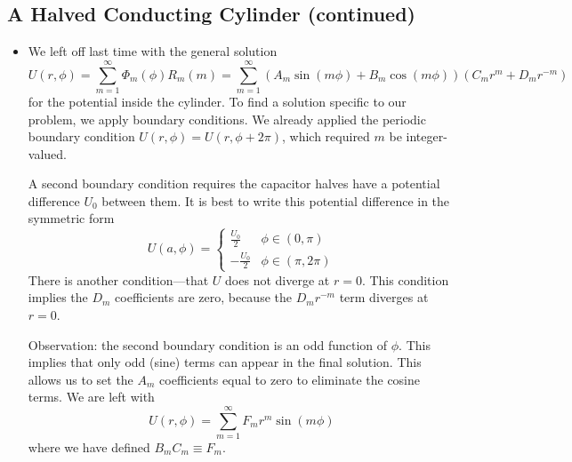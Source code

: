 \documentclass[11pt, a4paper]{article}
\begin{document}
\subsection{A Halved Conducting Cylinder (continued)}
\begin{itemize}	
		
	\item We left off last time with the general solution
	\begin{equation*}
		U(r, \phi) = \sum_{m = 1}^{\infty}\Phi_{m}(\phi)R_{m}(m) = \sum_{m = 1}^{\infty} \left(A_{m} \sin(m\phi) + B_{m}\cos(m\phi)\right)\left( C_{m}r^{m} + D_{m}r^{-m} \right)
	\end{equation*}
	for the potential inside the cylinder. To find a solution specific to our problem, we apply boundary conditions. We already applied the periodic boundary condition $ U(r, \phi) = U(r, \phi + 2\pi) $, which required $ m $ be integer-valued.
	
	
	A second boundary condition requires the capacitor halves have a potential difference $ U_{0} $ between them. It is best to write this potential difference in the symmetric form
	\begin{equation*}
		U(a, \phi) = 
		\begin{cases}
			\frac{U_{0}}{2} & \phi \in (0, \pi)\\
			-\frac{U_{0}}{2} & \phi \in (\pi, 2\pi)
		\end{cases}
	\end{equation*}
	There is another condition---that $ U $ does not diverge at $ r = 0 $. This condition implies the $ D_{m} $ coefficients are zero, because the $ D_{m}r^{-m} $ term diverges at $ r = 0 $. 
	
	Observation: the second boundary condition is an odd function of $ \phi $. This implies that only odd (sine) terms can appear in the final solution. This allows us to set the $ A_{m} $ coefficients equal to zero to eliminate the cosine terms. We are left with
	\begin{equation*}
		U(r, \phi) = \sum_{m=1}^{\infty} F_{m}r^{m} \sin (m\phi)
	\end{equation*}
	where we have defined $ B_{m}C_{m} \equiv F_{m} $. 
	

\end{itemize}
\end{document}
